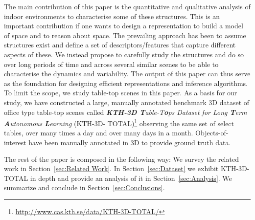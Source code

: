 \documentclass[letterpaper, 10 pt, conference]{ieeeconf}  %
\begin{document}
The main contribution of this paper is the quantitative and qualitative analysis of
indoor environments to characterise some of these structures. This is
an important contribution if one wants to design a representation to
build a model of space and to reason about space.  The prevailing
approach has been to assume structures exist and define a set of
descriptors/features that capture different aspects of these. We
instead propose to carefully study the structures and do so over long
periods of time and across several similar scenes to be able to characterise the
dynamics and variability. The output of this paper can thus serve as
the foundation for designing efficient representations and inference
algorithms. To limit the scope, we study table-top scenes in this
paper. As a basis for our study, we have constructed a large, manually annotated 
benchmark 3D dataset of office type table-top scenes called \textit{\textbf{KTH-3D
    T}able-T\textbf{o}ps Dataset for Long \textbf{T}erm
  \textbf{A}utonomous \textbf{L}earning} (KTH-3D-
TOTAL)\footnote{\url{http://www.cas.kth.se/data/KTH-3D-TOTAL/}} observing
the same set of select tables, over many times a day and over many
days in a month. Objects-of-interest have been manually annotated in
3D to provide ground truth data.

The rest of the paper is composed in the following way: We survey the related work in Section~\ref{sec:Related Work}. In Section~\ref{sec:Dataset} we exhibit KTH-3D-TOTAL in depth and provide an 
analysis of it in Section~\ref{sec:Analysis}. We summarize and conclude in Section~\ref{sec:Conclusions}.


\end{document}
